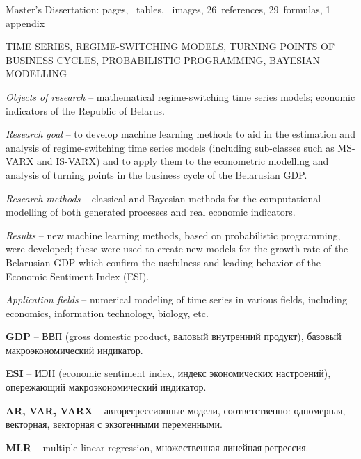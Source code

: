 \documentclass[a4paper,14pt]{extreport}
\newcommand{\totalreferences}{26}
\newcommand{\totalformulas}{29}
\begin{document}

Master's Dissertation: \pageref{LastPage} pages, \totaltables\ tables, \totalfigures\ images, \totalreferences\ references, \totalformulas\ formulas, 1 appendix

\MakeUppercase{time series, regime-switching models, turning points of business cycles, probabilistic programming, Bayesian modelling}

\textit{Objects of research} -- mathematical regime-switching time series models; economic indicators of the Republic of Belarus.

\textit{Research goal} -- to develop machine learning methods to aid in the estimation and analysis of regime-switching time series models (including sub-classes such as MS-VARX and IS-VARX) and to apply them to the econometric modelling and analysis of turning points in the business cycle of the Belarusian GDP.

\textit{Research methods} -- classical and Bayesian methods for the computational modelling of both generated processes and real economic indicators.

\textit{Results} -- new machine learning methods, based on probabilistic programming, were developed; these were used to create new models for the growth rate of the Belarusian GDP which confirm the usefulness and leading behavior of the Economic Sentiment Index (ESI).

\textit{Application fields} -- numerical modeling of time series in various fields, including economics, information technology, biology, etc.




\clearpage
\renewcommand{\contentsname}{Содержание}
\tableofcontents



\textbf{GDP} -- ВВП (gross domestic product, валовый внутренний продукт), базовый макроэкономический индикатор.

\textbf{ESI} -- ИЭН (economic sentiment index, индекс экономических настроений), опережающий макроэкономический индикатор.

\textbf{AR, VAR, VARX} -- авторегрессионные модели, соответственно: одномерная, векторная, векторная с экзогенными переменными.

\textbf{MLR} -- multiple linear regression, множественная линейная регрессия.
\end{document}
